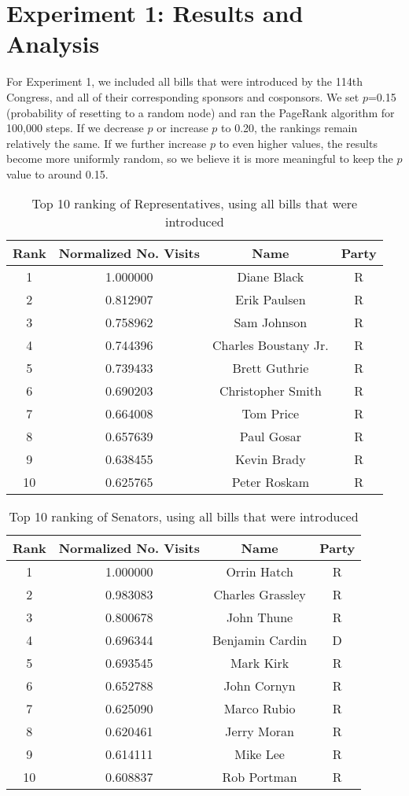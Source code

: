 \documentclass[11pt]{article}
\begin{document}
\section*{Experiment 1: Results and Analysis}
For Experiment 1, we included all bills that were introduced by the 114th Congress, and all of their corresponding sponsors and cosponsors. We set $p$=0.15 (probability of resetting to a random node) and ran the PageRank algorithm for 100,000 steps. If we decrease $p$ or increase $p$ to 0.20, the rankings remain relatively the same. If we further increase $p$ to even higher values, the results become more uniformly random, so we believe it is more meaningful to keep the $p$ value to around 0.15. 


\begin{table}[h!]
\centering
 \begin{tabular}{|c | c |c |c|} 
 \hline
 Rank & Normalized No. Visits & Name & Party \\ [0.5ex] 
 \hline
1  & 1.000000 & Diane Black & R \\
2  & 0.812907 & Erik Paulsen & R \\
3  & 0.758962 & Sam Johnson & R \\
4  & 0.744396 & Charles Boustany Jr. & R \\
5  & 0.739433 & Brett Guthrie & R \\
6  & 0.690203 & Christopher Smith & R \\
7  & 0.664008 & Tom Price & R \\
8  & 0.657639 & Paul Gosar & R \\
9  & 0.638455 & Kevin Brady & R \\
10 &  0.625765 &  Peter Roskam & R \\
 \hline
 
\end{tabular}
\caption{Top 10 ranking of Representatives, using all bills that were introduced}
\label{table:experiment1}
\end{table}

\begin{table}[h!]
\centering
 \begin{tabular}{|c | c |c |c|} 
 \hline
 Rank & Normalized No. Visits & Name & Party \\ [0.5ex] 
 \hline
1  & 1.000000 & Orrin Hatch &R\\
2  & 0.983083 & Charles Grassley &R\\
3  & 0.800678 & John Thune &R\\
4  & 0.696344  & Benjamin Cardin & D\\
5  & 0.693545  & Mark Kirk & R\\
6  & 0.652788  & John Cornyn & R\\
7  & 0.625090  & Marco Rubio & R\\
8  & 0.620461  & Jerry Moran & R\\
9  & 0.614111  & Mike Lee & R\\
10 &  0.608837 &  Rob Portman & R\\
 \hline
 
\end{tabular}
\caption{Top 10 ranking of Senators, using all bills that were introduced}
\label{table:experiment1_2}
\end{table}
\end{document}
